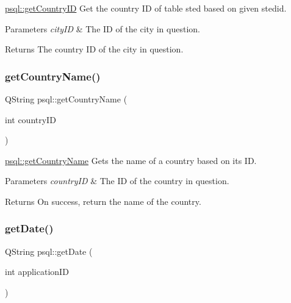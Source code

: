 \hyperlink{classpsql_a81d02dc0350ba11d90257914078ba432}{psql\+::get\+Country\+ID} Get the country ID of table sted based on given stedid. 


\begin{DoxyParams}{Parameters}
{\em city\+ID} & The ID of the city in question. \\
\hline
\end{DoxyParams}
\begin{DoxyReturn}{Returns}
The country ID of the city in question. 
\end{DoxyReturn}
\mbox{\label{classpsql_a5724e9992e6a5c98524ab73b98f4202d}} 
\subsubsection{\texorpdfstring{get\+Country\+Name()}{getCountryName()}}
{\footnotesize\ttfamily Q\+String psql\+::get\+Country\+Name (\begin{DoxyParamCaption}\item[{int}]{country\+ID }\end{DoxyParamCaption})}



\hyperlink{classpsql_a5724e9992e6a5c98524ab73b98f4202d}{psql\+::get\+Country\+Name} Gets the name of a country based on its ID. 


\begin{DoxyParams}{Parameters}
{\em country\+ID} & The ID of the country in question. \\
\hline
\end{DoxyParams}
\begin{DoxyReturn}{Returns}
On success, return the name of the country. 
\end{DoxyReturn}
\mbox{\label{classpsql_a561f96bfe7e9d092077712dd6b186af8}} 
\subsubsection{\texorpdfstring{get\+Date()}{getDate()}}
{\footnotesize\ttfamily Q\+String psql\+::get\+Date (\begin{DoxyParamCaption}\item[{int}]{application\+ID }\end{DoxyParamCaption})}



